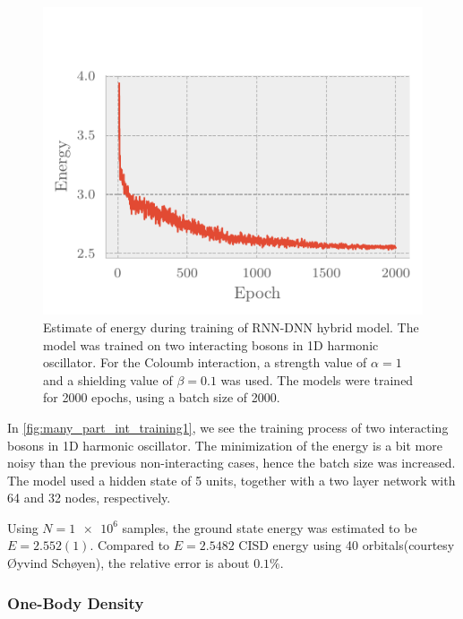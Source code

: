 \begin{figure}[H]
	\includegraphics[]{figures/many_part_int_training1.pdf}
	\caption{Estimate of energy during training of RNN-DNN hybrid model. The
      model was trained on two interacting bosons in 1D harmonic oscillator. For
      the Coloumb interaction, a strength value of $\alpha = 1$ and a shielding
      value of $\beta = 0.1$ was used. The models were trained for 2000 epochs,
      using a batch size of 2000.} 
	\label{fig:many_part_int_training1}
\end{figure}

In \autoref{fig:many_part_int_training1}, we see the training process of two interacting bosons in 1D harmonic oscillator. The minimization of the energy is a bit more noisy than the previous non-interacting cases, hence the batch size was increased. The model used a hidden state of 5 units, together with a two layer network with 64 and 32 nodes, respectively.

Using $N=\num{1e6}$ samples, the ground state energy was estimated to be $E = 2.552(1)$. Compared to $E = 2.5482$ CISD energy using 40 orbitals(courtesy Øyvind Schøyen), the relative error is about $0.1\%$.

\subsubsection{One-Body Density}

